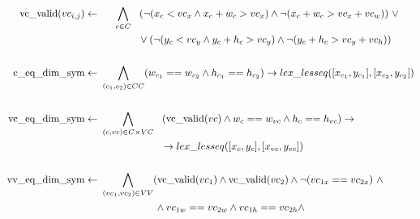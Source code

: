 \begin{align}
  \text{vc\_valid}(vc_{i,j})      \leftarrow & \ \hspace{0.45cm} \bigwedge_{c \in C} \hspace{0.3cm} (\neg(x_c < vc_x \land x_c + w_c > vc_x) \land \neg(x_c + w_c > vc_x + vc_w))\ \lor      \nonumber           \\
                                             & \ \hspace{1.3cm} \lor (\neg(y_c < vc_y \land y_c + h_c > vc_y) \land \neg(y_c + h_c > vc_y + vc_h))                                                               \\
                                             & \nonumber                                                                                                                                                         \\
  \text{c\_eq\_dim\_sym}          \leftarrow & \ \bigwedge_{(c_1, c_2) \in CC} (w_{c_1} == w_{c_2} \land h_{c_1} == h_{c_2}) \rightarrow lex\_lesseq([x_{c_1}, y_{c_1}], [x_{c_2}, y_{c_2}])                     \\
                                             & \nonumber                                                                                                                                                         \\
  \text{vc\_eq\_dim\_sym}         \leftarrow & \ \bigwedge_{(c, vc) \in C \times VC} \hspace{0.3cm} (\text{vc\_valid}(vc) \land w_{c} == w_{vc} \land h_{c} == h_{vc}) \rightarrow               \nonumber \\
                                             & \hspace{2.2cm} \rightarrow lex\_lesseq([x_{c}, y_{c}], [x_{vc}, y_{vc}])                                                                                    \\
                                             & \nonumber                                                                                                                                                         \\
  \text{vv\_eq\_dim\_sym}         \leftarrow & \ \bigwedge_{(vc_1, vc_2) \in VV} (\text{vc\_valid}(vc_1) \land \text{vc\_valid}(vc_2) \land \neg (vc_{1x} == vc_{2x})\ \land                           \nonumber \\
                                             & \hspace{2cm} \land vc_{1w} == vc_{2w} \land vc_{1h} == vc_{2h} \land \nonumber                                                                                    \\

\end{align}
